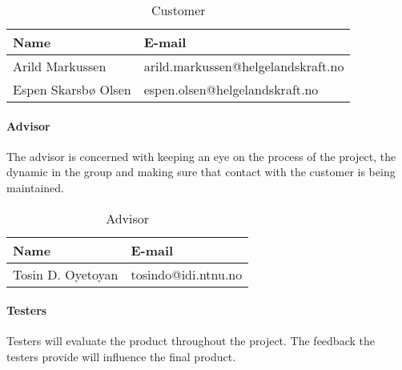 \begin{table}

\begin{center}
    \begin{tabular}{| l | l |}
   	\hline
    {\bf Name} & {\bf E-mail} \\ \hline \hline
    Arild Markussen & arild.markussen@helgelandskraft.no \\ \hline
    Espen Skarsbø Olsen & espen.olsen@helgelandskraft.no \\
    \hline
    \end{tabular}
\end{center}

\caption{Customer}
\end{table}

\paragraph{Advisor}

The advisor is concerned with keeping an eye on the process of the project, the dynamic in the group and making sure that contact with the customer is being maintained. 

\begin{table}

\begin{center}
    \begin{tabular}{| l | l |}
    \hline
    {\bf Name} & {\bf E-mail} \\ \hline \hline
    Tosin D. Oyetoyan & tosindo@idi.ntnu.no \\ \hline
    \hline
    \end{tabular}
\end{center}

\caption{Advisor}
\end{table}

\paragraph{Testers}

Testers will evaluate the product throughout the project. The feedback the testers provide will influence the final product.